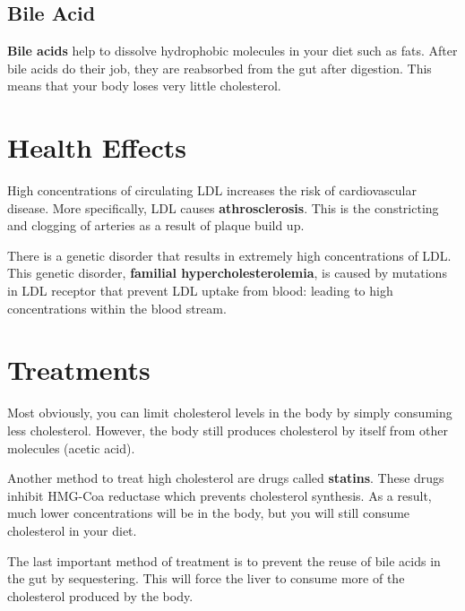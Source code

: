 \documentclass{article}
\begin{document}
\subsection{ Bile Acid }

\textbf{Bile acids} help to dissolve hydrophobic molecules in your diet such as
fats. After bile acids do their job, they are reabsorbed from the gut after
digestion. This means that your body loses very little cholesterol.

\section{ Health Effects }

High concentrations of circulating LDL increases the risk of cardiovascular
disease. More specifically, LDL causes \textbf{athrosclerosis}. This is the
constricting and clogging of arteries as a result of plaque build up.

There is a genetic disorder that results in extremely high concentrations of
LDL. This genetic disorder, \textbf{familial hypercholesterolemia}, is caused by
mutations in LDL receptor that prevent LDL uptake from blood: leading to high
concentrations within the blood stream.

\section{ Treatments }

Most obviously, you can limit cholesterol levels in the body by simply consuming
less cholesterol. However, the body still produces cholesterol by itself from
other molecules (acetic acid).

Another method to treat high cholesterol are drugs called \textbf{statins}.
These drugs inhibit HMG-Coa reductase which prevents cholesterol synthesis. As a
result, much lower concentrations will be in the body, but you will still
consume cholesterol in your diet. 

The last important method of treatment is to prevent the reuse of bile acids in
the gut by sequestering. This will force the liver to consume more of the
cholesterol produced by the body.
\end{document}
